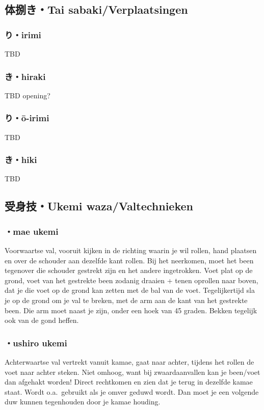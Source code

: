 \subsection{体捌き・Tai sabaki/Verplaatsingen}
\subsubsection{り・irimi}
TBD

\subsubsection{き・hiraki}
TBD opening?

\subsubsection{り・\={o}-irimi}
TBD

\subsubsection{き・hiki}
TBD

\subsection{受身技・Ukemi waza/Valtechnieken}
\subsubsection{・mae ukemi}
Voorwaartse val, vooruit kijken in de richting waarin je wil rollen, hand plaatsen en over de schouder aan dezelfde kant rollen. Bij het neerkomen, moet het been tegenover die schouder gestrekt zijn en het andere ingetrokken. Voet plat op de grond, voet van het gestrekte been zodanig draaien + tenen oprollen naar boven, dat je die voet op de grond kan zetten met de bal van de voet. Tegelijkertijd sla je op de grond om je val te breken, met de arm aan de kant van het gestrekte been. Die arm moet naast je zijn, onder een hoek van 45 graden. Bekken tegelijk ook van de gond heffen.

\subsubsection{・ushiro ukemi}
Achterwaartse val vertrekt vanuit kamae, gaat naar achter, tijdens het rollen de voet naar achter steken. Niet omhoog, want bij zwaardaanvallen kan je been/voet dan afgehakt worden! Direct rechtkomen en zien dat je terug in dezelfde kamae staat. Wordt o.a.\ gebruikt als je omver geduwd wordt. Dan moet je een volgende duw kunnen tegenhouden door je kamae houding.

